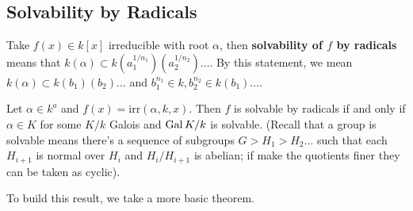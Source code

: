 \subsection{Solvability by Radicals}
Take $f(x) \in k[x]$ irreducible with root $\alpha$,
then \textbf{solvability of $f$ by radicals}
means that $k(\alpha) \subset k(a_1^{1/n_1})(a_2^{1/n_2}) \dots$.
By this statement, we mean $k(\alpha) \subset k(b_1)(b_2)\dots$
and $b_1^{n_1} \in k, b_2^{n_2} \in k(b_1) \dots$.
\begin{theorem}
    Let $\alpha \in k^a$ and $f(x) = \text{irr}(\alpha, k, x)$.
    Then $f$ is solvable by radicals if and only if $\alpha \in K$
    for some $K/k$ Galois and $\operatorname{Gal} K/k$ is solvable. (Recall that a group
    is solvable means there's a sequence of subgroups $G > H_1 > H_2 \dots$
    such that each $H_{i + 1}$ is normal over $H_{i}$
    and $H_{i}/H_{i+1}$ is abelian; if make the quotients finer
    they can be taken as cyclic).
\end{theorem}
To build this result, we take a more basic theorem.
